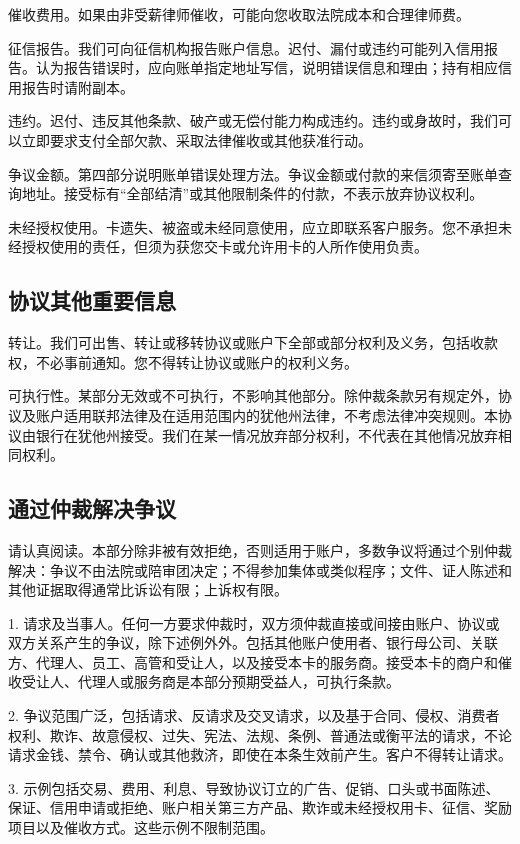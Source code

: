 \documentclass[UTF8,fontset=none,11pt,a4paper]{ctexart}
\begin{document}
催收费用。如果由非受薪律师催收，可能向您收取法院成本和合理律师费。


征信报告。我们可向征信机构报告账户信息。迟付、漏付或违约可能列入信用报告。认为报告错误时，应向账单指定地址写信，说明错误信息和理由；持有相应信用报告时请附副本。


违约。迟付、违反其他条款、破产或无偿付能力构成违约。违约或身故时，我们可以立即要求支付全部欠款、采取法律催收或其他获准行动。


争议金额。第四部分说明账单错误处理方法。争议金额或付款的来信须寄至账单查询地址。接受标有“全部结清”或其他限制条件的付款，不表示放弃协议权利。


未经授权使用。卡遗失、被盗或未经同意使用，应立即联系客户服务。您不承担未经授权使用的责任，但须为获您交卡或允许用卡的人所作使用负责。


\subsection*{协议其他重要信息}
转让。我们可出售、转让或移转协议或账户下全部或部分权利及义务，包括收款权，不必事前通知。您不得转让协议或账户的权利义务。


可执行性。某部分无效或不可执行，不影响其他部分。除仲裁条款另有规定外，协议及账户适用联邦法律及在适用范围内的犹他州法律，不考虑法律冲突规则。本协议由银行在犹他州接受。我们在某一情况放弃部分权利，不代表在其他情况放弃相同权利。


\subsection*{通过仲裁解决争议}
请认真阅读。本部分除非被有效拒绝，否则适用于账户，多数争议将通过个别仲裁解决：争议不由法院或陪审团决定；不得参加集体或类似程序；文件、证人陈述和其他证据取得通常比诉讼有限；上诉权有限。


1. 请求及当事人。任何一方要求仲裁时，双方须仲裁直接或间接由账户、协议或双方关系产生的争议，除下述例外外。包括其他账户使用者、银行母公司、关联方、代理人、员工、高管和受让人，以及接受本卡的服务商。接受本卡的商户和催收受让人、代理人或服务商是本部分预期受益人，可执行条款。


2. 争议范围广泛，包括请求、反请求及交叉请求，以及基于合同、侵权、消费者权利、欺诈、故意侵权、过失、宪法、法规、条例、普通法或衡平法的请求，不论请求金钱、禁令、确认或其他救济，即使在本条生效前产生。客户不得转让请求。


3. 示例包括交易、费用、利息、导致协议订立的广告、促销、口头或书面陈述、保证、信用申请或拒绝、账户相关第三方产品、欺诈或未经授权用卡、征信、奖励项目以及催收方式。这些示例不限制范围。
\end{document}
